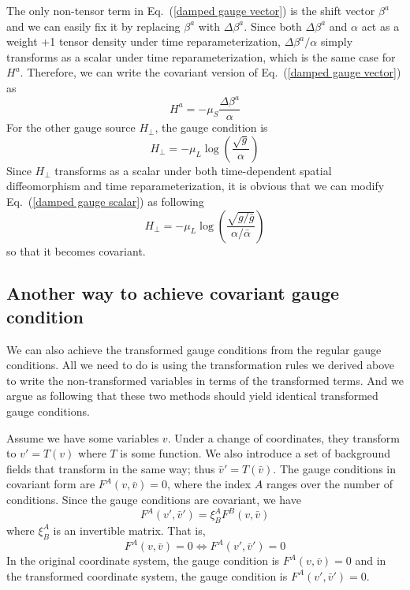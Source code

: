 The only non-tensor term in Eq.~(\ref{damped gauge vector}) is the shift vector $\beta^{a}$ and we can easily fix it by replacing $\beta^{a}$ with $\Delta \beta^{a}$. Since both $\Delta \beta^{a}$ and $\alpha$ act as a weight +1 tensor density under time reparameterization, $\Delta \beta^{a}/\alpha$ simply transforms as a scalar under time reparameterization, which is the same case for $H^{a}$. Therefore, we can write the covariant version of Eq.~(\ref{damped gauge vector}) as
\begin{equation}\label{covariant damped gauge vector}
H^{a} = -\mu_{S}\frac{\Delta \beta^{a}}{\alpha}
\end{equation}
For the other gauge source $H_{\perp}$, the gauge condition is
\begin{equation}\label{damped gauge scalar}
H_{\perp} = -\mu_{L}\log\left(\frac{\sqrt{g}}{\alpha}\right)
\end{equation}
Since $H_{\perp}$ transforms as a scalar under both time-dependent spatial diffeomorphism and time reparameterization, it is obvious that we can modify Eq.~(\ref{damped gauge scalar}) as following
\begin{equation}\label{covariant damped gauge scalar}
H_{\perp} = -\mu_{L}\log\left(\frac{\sqrt{g/{\bar g}}}{\alpha/{\bar \alpha}}\right)
\end{equation} 
so that it becomes covariant. 
\subsection{Another way to achieve covariant gauge condition}
We can also achieve the transformed gauge conditions from the regular gauge conditions. All we need to do is using the transformation rules we derived above to write the non-transformed variables in terms of the transformed terms. And we argue as following that these two methods should yield identical transformed gauge conditions. 

Assume we have some variables $v$. Under a change of coordinates, they transform to $v' = T\left(v\right)$ where $T$ is some function. We also introduce a 
set of background fields that transform in the same way; thus $\bar v' = T\left(\bar v\right)$. The gauge conditions in covariant form are $F^A\left(v,\bar v\right) = 0$, 
where the index $A$ ranges over the number of conditions. Since the gauge conditions are covariant, we have 
\begin{equation}
	F^A\left(v',\bar v'\right) = \xi^A_B F^B\left(v,\bar v\right)
\end{equation}
where $\xi^A_B$ is an invertible matrix. That is, 
\begin{equation}\label{covariant equivalence}
	 F^A\left(v,\bar v\right) = 0 \Longleftrightarrow F^A\left(v',\bar v'\right) = 0
\end{equation}
In the original coordinate system, the gauge condition is $F^A\left(v,\bar v\right) = 0$ and in the transformed coordinate system, the 
gauge condition is $F^A\left(v',\bar v'\right) = 0$.

